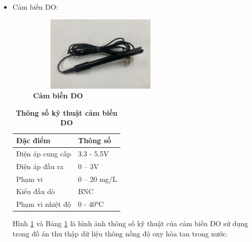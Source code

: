 \documentclass{article} %
\begin{document}
\begin{itemize}
\begin{itemize}[label=$\ast$]
			\item Cảm biến DO:
			\begin{figure}[!ht]
				\centering
				\includegraphics[width=7cm,height=3.6cm]{Images/DOsensor.png}
				\caption[Cảm biến DO\cite{DODF}]{\bfseries \fontsize{12pt}{0pt}\selectfont Cảm biến DO\cite{DODF}}
				\label{DOsensor}
			\end{figure}
			\begin{table}[H]
				\centering
				\begin{tabular}{|l|l|}
					\hline
					Đặc điểm         & Thông số    \\ \hline
					Điện áp cung cấp & 3.3 - 5.5V  \\ \hline
					Điện áp đầu ra   & 0 – 3V      \\ \hline
					Phạm vi          & 0 – 20 mg/L \\ \hline
					Kiểu đầu dò      & BNC         \\ \hline
					Phạm vi nhiệt độ & 0 - 40°C    \\ \hline
				\end{tabular}
				\caption[Thông số kỹ thuật cảm biến DO\cite{DODF}]{\bfseries\fontsize{12pt}{0pt}\selectfont Thông số kỹ thuật cảm biến DO\cite{DODF}}
				\label{ThongsoDO}
			\end{table}
			Hình \ref{DOsensor} và Bảng \ref{ThongsoDO} là hình ảnh thông số kỹ thuật của cảm biến DO sử dụng trong đồ án thu thập dữ liệu thông nồng độ oxy hòa tan trong nước.
			

\end{itemize}
\end{itemize}
\end{document}

